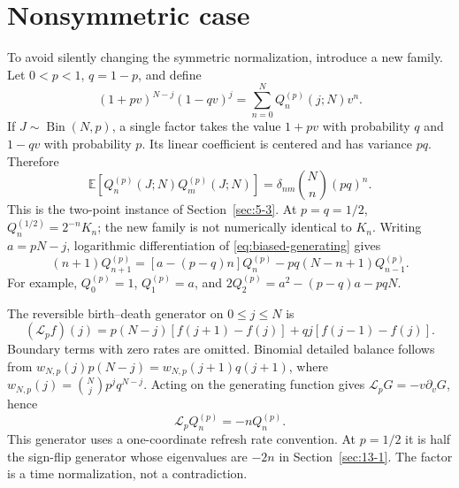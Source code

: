 \section{Nonsymmetric case}
\label{sec:13-2}
To avoid silently changing the symmetric normalization, introduce a new family. Let $0<p<1$, $q=1-p$, and define
\begin{equation}\label{eq:biased-generating}
(1+pv)^{N-j}(1-qv)^j=\sum_{n=0}^N Q_n^{(p)}(j;N)v^n.
\end{equation}
If $J\sim\operatorname{Bin}(N,p)$, a single factor takes the value $1+pv$ with probability $q$ and $1-qv$ with probability $p$. Its linear coefficient is centered and has variance $pq$. Therefore
\[
\mathbb E[Q_n^{(p)}(J;N)Q_m^{(p)}(J;N)]
=\delta_{nm}\binom Nn(pq)^n.
\]
This is the two-point instance of Section~\ref{sec:5-3}. At $p=q=1/2$, $Q_n^{(1/2)}=2^{-n}K_n$; the new family is not numerically identical to $K_n$.
Writing $a=pN-j$, logarithmic differentiation of \eqref{eq:biased-generating} gives
\[
(n+1)Q_{n+1}^{(p)}=[a-(p-q)n]Q_n^{(p)}-pq(N-n+1)Q_{n-1}^{(p)}.
\]
For example, $Q_0^{(p)}=1$, $Q_1^{(p)}=a$, and $2Q_2^{(p)}=a^2-(p-q)a-pqN$.

The reversible birth--death generator on $0\le j\le N$ is
\[
(\mathcal L_pf)(j)=p(N-j)[f(j+1)-f(j)]+qj[f(j-1)-f(j)].
\]
Boundary terms with zero rates are omitted. Binomial detailed balance follows from
$w_{N,p}(j)p(N-j)=w_{N,p}(j+1)q(j+1)$, where $w_{N,p}(j)=\binom Njp^jq^{N-j}$. Acting on the generating function gives $\mathcal L_pG=-v\partial_vG$, hence
\[
\mathcal L_pQ_n^{(p)}=-nQ_n^{(p)}.
\]
This generator uses a one-coordinate refresh rate convention. At $p=1/2$ it is half the sign-flip generator whose eigenvalues are $-2n$ in Section~\ref{sec:13-1}. The factor is a time normalization, not a contradiction.

